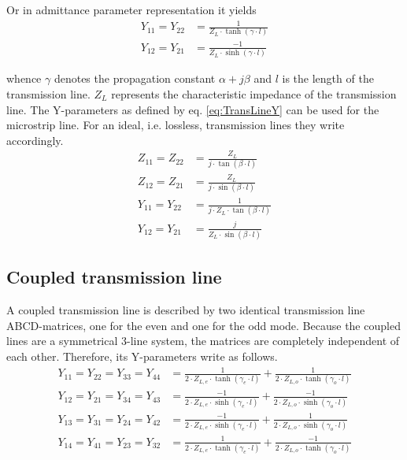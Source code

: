 Or in admittance parameter representation it yields
\begin{equation}
\label{eq:TransLineY}
\begin{split}
Y_{11} = Y_{22} &= \frac{1}{Z_L \cdot \tanh{\left(\gamma\cdot l\right)}}\\
Y_{12} = Y_{21} &= \frac{-1}{Z_L\cdot \sinh{\left(\gamma\cdot l\right)}}
\end{split}
\end{equation}

whence $\gamma$ denotes the propagation constant $\alpha + j\beta$ and
$l$ is the length of the transmission line.  $Z_L$ represents the
characteristic impedance of the transmission line.  The Y-parameters
as defined by eq. \eqref{eq:TransLineY} can be used for the microstrip
line.  For an ideal, i.e. lossless, transmission lines they write
accordingly.
\begin{align}
Z_{11} = Z_{22} &= \frac{Z_L}{j\cdot\tan{\left(\beta\cdot l\right)}}\\
Z_{12} = Z_{21} &= \frac{Z_L}{j\cdot\sin{\left(\beta\cdot l\right)}}\\
Y_{11} = Y_{22} &= \frac{1}{j\cdot Z_L \cdot \tan{\left(\beta\cdot l\right)}}\\
Y_{12} = Y_{21} &= \frac{j}{Z_L\cdot \sin{\left(\beta\cdot l\right)}}
\end{align}

\subsection{Coupled transmission line}

A coupled transmission line is described by two identical transmission
line ABCD-matrices, one for the even and one for the odd mode.
Because the coupled lines are a symmetrical 3-line system, the
matrices are completely independent of each other.  Therefore, its
Y-parameters write as follows.
\begin{align}
Y_{11} = Y_{22} = Y_{33} = Y_{44} &= \frac{1}{2\cdot Z_{L,e} \cdot \tanh\left(\gamma_e\cdot l\right)}
              + \frac{1}{2\cdot Z_{L,o} \cdot \tanh\left(\gamma_o\cdot l\right)}\\
Y_{12} = Y_{21} = Y_{34} = Y_{43} &= \frac{-1}{2\cdot Z_{L,e} \cdot \sinh\left(\gamma_e\cdot l\right)}
              + \frac{-1}{2\cdot Z_{L,o} \cdot \sinh\left(\gamma_o\cdot l\right)}\\
Y_{13} = Y_{31} = Y_{24} = Y_{42} &= \frac{-1}{2\cdot Z_{L,e} \cdot \sinh\left(\gamma_e\cdot l\right)}
              + \frac{1}{2\cdot Z_{L,o} \cdot \sinh\left(\gamma_o\cdot l\right)}\\
Y_{14} = Y_{41} = Y_{23} = Y_{32} &= \frac{1}{2\cdot Z_{L,e} \cdot \tanh\left(\gamma_e\cdot l\right)}
              + \frac{-1}{2\cdot Z_{L,o} \cdot \tanh\left(\gamma_o\cdot l\right)}
\end{align}

